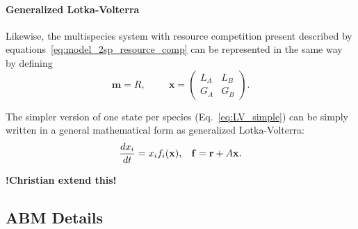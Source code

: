 \documentclass[10pt,A4paper]{article}
\numberwithin{equation}{section}
\newcommand{\mbx}{\mathbf{x}}
\newcommand{\mbm}{\mathbf{m}}
\begin{document}
\paragraph{Generalized Lotka-Volterra}

Likewise, the multispecies system with resource competition present described by equations~\ref{eq:model_2sp_resource_comp} can be represented in the same way by defining
\begin{equation}
    \mbm = R, \hspace{1cm}
    \mbx = \begin{pmatrix}
        L_A & L_B \\
        G_A & G_B 
    \end{pmatrix}.
\label{eq:gLV_x_m}
\end{equation}

The simpler version of one state per species (Eq.~\ref{eq:LV_simple}) can be simply written in a general mathematical form as generalized Lotka-Volterra:
\begin{equation}
    \frac{d x_i}{d t} = x_i f_i (\mbx), \hspace{3mm} \mathbf{f} = \mathbf{r} + A \mbx.
\label{eq:gLV}
\end{equation}

\textbf{!Christian extend this!}

%

\subsection{ABM Details} \label{ssec:supplement2}
\end{document}
